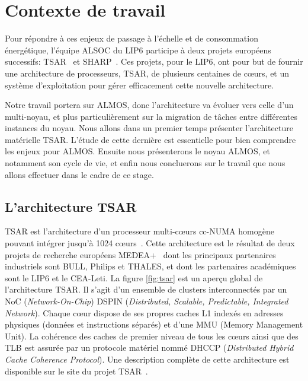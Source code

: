 \chapter{Contexte de travail}
\label{sec:context}

  Pour répondre à ces enjeux de passage à l'échelle et de consommation
  énergétique, l'équipe ALSOC du LIP6 participe à deux projets européens
  successifs: TSAR~\cite{tsar2008} et SHARP~\cite{sharp2012}. Ces projets, pour
  le LIP6, ont pour but de fournir une architecture de processeurs, TSAR, de
  plusieurs centaines de c\oe urs, et un système d'exploitation pour gérer
  efficacement cette nouvelle architecture.

  Notre travail portera sur ALMOS, donc l'architecture va évoluer vers celle
  d'un multi-noyau, et plus particulièrement sur la migration de tâches entre
  différentes instances du noyau. Nous allons dans un premier temps présenter
  l'architecture matérielle TSAR. L'étude de cette dernière est essentielle pour
  bien comprendre les enjeux pour ALMOS. Ensuite nous présenterons le noyau
  ALMOS, et notamment son cycle de vie, et enfin nous concluerons sur le travail
  que nous allons effectuer dans le cadre de ce stage.
  

  \section{L'architecture TSAR}
  \label{sec:tsar}

    TSAR est l'architecture d’un processeur multi-c\oe urs cc-NUMA homogène
    pouvant intégrer jusqu’à 1024 c\oe urs~\cite{greiner2009tsar}. Cette
    architecture est le résultat de deux projets de recherche européens
    MEDEA+~\cite{tsar2008,sharp2012} dont les principaux partenaires industriels
    sont BULL, Philips et THALES, et dont les partenaires académiques sont le
    LIP6 et le CEA-Leti. La figure \ref{fig:tsar} est un aperçu global de
    l'architecture TSAR. Il s'agit d'un ensemble de clusters interconnectés par
    un NoC (\textit{Network-On-Chip}) DSPIN (\textit{Distributed, Scalable,
      Predictable, Integrated Network}). Chaque c\oe ur dispose de ses propres
    caches L1 indexés en adresses physiques (données et instructions séparés) et
    d'une MMU (Memory Management Unit). La cohérence des caches de premier
    niveau de tous les c\oe urs ainsi que des TLB est assurée par un protocole
    matériel nommé DHCCP (\textit{Distributed Hybrid Cache Coherence
      Protocol}). Une description complète de cette architecture est disponible
    sur le site du projet TSAR~\cite{tsar2008web}.

